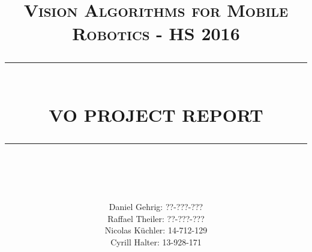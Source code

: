 \documentclass[12pt]{report}
\newcommand{\HRule}[1]{\rule{\linewidth}{#1}}
\begin{document}
\title{ \normalsize \textsc{Vision Algorithms for Mobile Robotics - HS 2016}
\\ [2.0cm]
\HRule{0.5pt} \\
\LARGE \textbf{\uppercase{VO Project Report}}
\HRule{2pt} \\ [0.5cm]
}

\author{
Daniel Gehrig: ??-???-??? \\
Raffael Theiler: ??-???-??? \\
Nicolas Küchler: 14-712-129 \\
Cyrill Halter: 13-928-171 }
\date{}

\maketitle
\tableofcontents
\newpage

\sectionfont{\scshape}

%


\newpage

\newpage

\newpage

\end{document}
